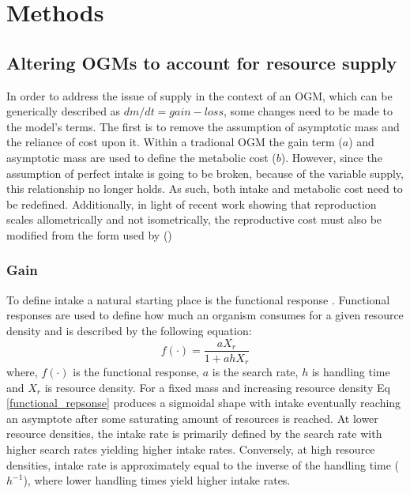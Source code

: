 \documentclass[a4paper, 11pt, hidelinks]{article} %
\begin{document}

% 
	\nolinenumbers
	
\section{Methods}
	\linenumbers
	
	\subsection{Altering OGMs to account for resource supply}
	In order to address the issue of supply in the context of an OGM, which can be generically described as $dm/dt = gain - loss$, some changes need to be made to the model's terms.  The first is to remove the assumption of asymptotic mass and the reliance of cost upon it.  Within a tradional OGM the gain term ($ a $) and asymptotic mass are used to define the metabolic cost ($ b $).  However, since the assumption of perfect intake is going to be broken, because of the variable supply, this relationship no longer holds.  As such, both intake and metabolic cost need to be redefined.  Additionally, in light of recent work showing that reproduction scales allometrically and not isometrically, the reproductive cost must also be modified from the form used by \citeauthor{Charnov2001} (\citeyear{Charnov2001}) \parencite{Marshall2019, Barneche2018} %
	
	
	\subsubsection{Gain}
	To define intake a natural starting place is the functional response \parencite{Holling1959}.  Functional responses  are used to define how much an organism consumes for a given resource density and is described by the following equation:	
	\begin{equation}
		\label{functional_repsonse}
		f(\cdot) = \frac{a X_r}{1 + a h X_r}
	\end{equation}
	where, $ f(\cdot) $ is the functional response, $ a $ is the search rate, $ h $ is handling time and $ X_r $ is resource density.  
	For a fixed mass and increasing resource density Eq \ref{functional_repsonse} produces a sigmoidal shape with intake eventually reaching an asymptote after some saturating amount of resources is reached.  At lower resource densities, the intake rate is primarily defined by the search rate with higher search rates yielding higher intake rates.  Conversely, at high resource densities, intake rate is approximately equal to the inverse of the handling time ($ h^{-1} $), where lower handling times yield higher intake rates.  
	
\end{document}
